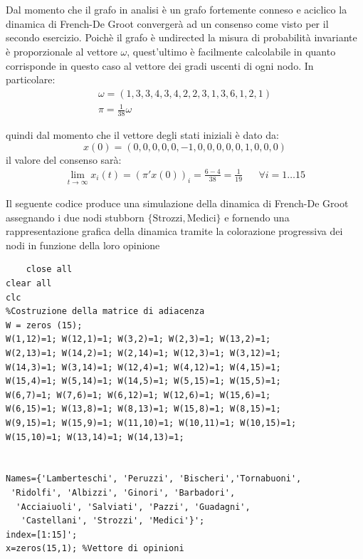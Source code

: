 \documentclass[11pt,largemargins]{homework}
\begin{document}
\section{}%
\begin{alphaparts}
  \questionpart
  Dal momento che il grafo in analisi è un grafo fortemente conneso e aciclico la dinamica di French-De Groot convergerà ad un consenso come visto per il secondo esercizio.
  Poichè il grafo è undirected la misura di probabilità invariante è proporzionale al vettore \(\omega\), quest'ultimo è facilmente calcolabile in quanto corrisponde in questo caso al vettore dei gradi uscenti di ogni nodo. In particolare:
  \begin{gather*}
    \omega = (1 , 3 , 3 , 4 , 3 , 4 , 2 , 2 , 3 , 1 , 3 , 6 , 1 , 2 , 1)\\
    \pi=\frac{1}{38}\omega
  \end{gather*}

  quindi dal momento che il vettore degli stati iniziali è dato da:
  \begin{equation*}
    x(0)=(0,0,0,0,0,-1,0,0,0,0,0,1,0,0,0)
  \end{equation*}
  il valore del consenso sarà:
  \begin{align*}
    \lim\limits_{t \rightarrow \infty} x_i(t) = \left(\pi'x(0)\right)_i = \frac{6-4}{38}=\frac{1}{19} && \forall i=1\dots 15
  \end{align*}

  \questionpart
  Il seguente codice  produce una simulazione della dinamica di French-De Groot assegnando i due nodi stubborn \(\{\text{Strozzi}, \text{Medici}\}\) e fornendo una rappresentazione grafica della dinamica tramite la colorazione progressiva dei nodi in funzione della loro opinione
  \begin{lstlisting}
    close all
clear all
clc
%Costruzione della matrice di adiacenza
W = zeros (15);
W(1,12)=1; W(12,1)=1; W(3,2)=1; W(2,3)=1; W(13,2)=1; 
W(2,13)=1; W(14,2)=1; W(2,14)=1; W(12,3)=1; W(3,12)=1;
W(14,3)=1; W(3,14)=1; W(12,4)=1; W(4,12)=1; W(4,15)=1;
W(15,4)=1; W(5,14)=1; W(14,5)=1; W(5,15)=1; W(15,5)=1;
W(6,7)=1; W(7,6)=1; W(6,12)=1; W(12,6)=1; W(15,6)=1;
W(6,15)=1; W(13,8)=1; W(8,13)=1; W(15,8)=1; W(8,15)=1;
W(9,15)=1; W(15,9)=1; W(11,10)=1; W(10,11)=1; W(10,15)=1;
W(15,10)=1; W(13,14)=1; W(14,13)=1;


Names={'Lamberteschi', 'Peruzzi', 'Bischeri','Tornabuoni',
 'Ridolfi', 'Albizzi', 'Ginori', 'Barbadori',
  'Acciaiuoli', 'Salviati', 'Pazzi', 'Guadagni',
   'Castellani', 'Strozzi', 'Medici'}';
index=[1:15]';
x=zeros(15,1); %Vettore di opinioni


\end{lstlisting}
\end{alphaparts}
\end{document}
